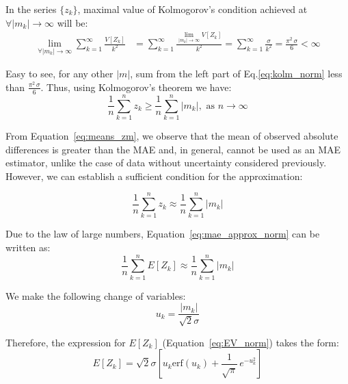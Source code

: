 \documentclass[12pt,a4paper]{article}
\theoremstyle{definition}
\begin{document}
In the series $\{z_k\}$, maximal value of Kolmogorov's condition achieved at $\forall |m_k|\to\infty$ will be:
\begin{equation}
	\begin{aligned}
		\lim\limits_{\forall|m_k|\to\infty} \sum\limits_{k=1}^{\infty}\frac{V[Z_k]}{k^2} &= \sum\limits_{k=1}^{\infty} \frac{\lim\limits_{|m_k|\to\infty} V[Z_k]}{k^2} = \sum\limits_{k=1}^{\infty} \frac{\sigma}{k^2} = \frac{\pi^2\,\sigma}{6} < \infty
	\end{aligned}
	\label{eq:kolm_norm}
\end{equation}

Easy to see, for any other $|m|$, sum from the left part of Eq.\ref{eq:kolm_norm} less than $\frac{\pi^2\,\sigma}{6}$. Thus, using Kolmogorov's theorem we have:
\begin{equation}
	\frac{1}{n} \sum\limits_{k=1}^{n} z_k \geq \frac{1}{n}\sum\limits_{k=1}^{n} |m_k| , \text{ as } n\to\infty
	\label{eq:means_zm}
\end{equation}

From Equation~\ref{eq:means_zm}, we observe that the mean of observed absolute differences is greater than the MAE and, in general, cannot be used as an MAE estimator, unlike the case of data without uncertainty considered previously. However, we can establish a sufficient condition for the approximation: 

\begin{equation}
	\frac{1}{n} \sum\limits_{k=1}^{n} z_k \approx \frac{1}{n}\sum\limits_{k=1}^{n} |m_k|
	\label{eq:mae_approx_norm}
\end{equation}

Due to the law of large numbers, Equation~\ref{eq:mae_approx_norm} can be written as:
\begin{equation}
	\frac{1}{n} \sum\limits_{k=1}^{n} E[Z_k] \approx \frac{1}{n}\sum\limits_{k=1}^{n} |m_k|
	\label{eq:mae_approx_norm_EZ}
\end{equation}

We make the following change of variables: 
\begin{equation}
	u_k = \frac{|m_k|}{\sqrt{2} \sigma}
	\label{eq:var_change}
\end{equation}

Therefore, the expression for $E[Z_k]$ (Equation~\ref{eq:EV_norm}) takes the form:
\begin{equation}
	E[Z_k] = \sqrt{2}\sigma \left[u_k \mathrm{erf}(u_k) + \frac{1}{\sqrt{\pi}}\,e^{-u_k^2}\right]
\end{equation}
\end{document}
